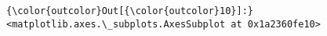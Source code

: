\documentclass[11pt]{article}
\begin{document}
\begin{Verbatim}[commandchars=\\\{\}]
{\color{outcolor}Out[{\color{outcolor}10}]:} <matplotlib.axes.\_subplots.AxesSubplot at 0x1a2360fe10>
\end{Verbatim}
            
    \begin{center}
    \end{center}
    { \hspace*{\fill} \\}
    

    
    
    
    
\end{document}
